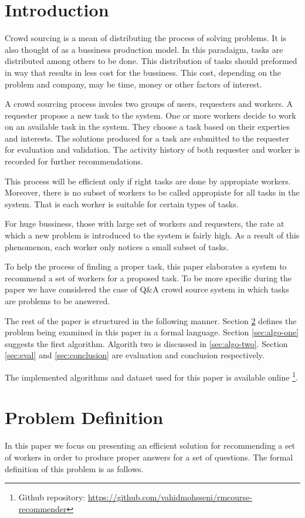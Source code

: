 \documentclass{template}
\begin{document}
\section{Introduction}
\label{sec:intro}
Crowd sourcing is a mean of distributing the process of solving problems.
It is also thought of as a bussiness production model. In this paradaigm,
tasks are distributed among others to be done. This distribution of tasks
should preformed in way that results in less cost for the bussiness. This
cost, depending on the problem and company, may be time, money or other factors
of interest.

A crowd sourcing process involes two groups of users, requesters and workers. 
A requester propose a new task to the system. One or more workers decide to work
on an available task in the system. They choose a task based on their experties and interests. 
The solutions produced for a task are submitted to the requester for evaluation and validation.
The activity history of both requester and worker is recorded for further recommendations.

This process will be efficient only if right tasks are done by appropiate workers.
Moreover, there is no subset of workers to be called appropiate for all tasks
in the system. That is each worker is suitable for certain types of tasks.

For huge bussiness, those with large set of workers and requesters, the rate at
which a new problem is introduced to the system is fairly high. As a result of this
phenomenon, each worker only notices a small subset of tasks.

To help the process of finding a proper task, this paper elaborates a system
to recommend a set of workers for a proposed task. To be more specific during the
paper we have considered the case of Q\&A crowd source system in which tasks are
problems to be answered.

The rest of the paper is structured in the following manner.
Section \ref{sec:prblm-def} defines the problem being examined in this 
paper in a formal language. Section \ref{sec:algo-one} suggests the first algorithm.
Algorith two is discussed in \ref{sec:algo-two}. Section \ref{sec:eval} and \ref{sec:conclusion}
are evaluation and conclusion respectively.

The implemented algorithms and dataset used for this paper is available online
\footnote{Github repository: \url{https://github.com/vahidmohsseni/rmcourse-recommender}}.


\section{Problem Definition}
\label{sec:prblm-def}
In this paper we focus on presenting an efficient solution for recommending
a set of workers in order to produce proper answers for a set of questions.
The formal definition of this problem is as follows.
\end{document}
